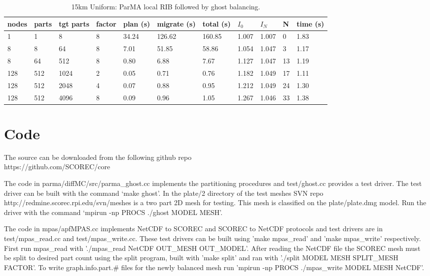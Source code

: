 \documentclass[a4paper]{article}
\begin{document}
\begin{table}
\caption{\label{tab:15kmplrib}15km Uniform: ParMA local RIB followed by ghost balancing.}
\begin{tabular}{  l | l | l | l | l | l | l | l | l | l | l }
    \hline
    nodes & parts & tgt parts & factor & plan (s) & migrate (s) & total (s) & $I_0$ & $I_N$ & N & time (s) \\ \hline
      1 & 1 & 8 & 8 & 34.24 & 126.62 & 160.85 & 1.007 & 1.007 & 0 & 1.83 \\ 
      8 & 8 & 64 & 8 & 7.01 & 51.85 & 58.86 & 1.054 & 1.047 & 3 & 1.17 \\ 
      8 & 64 & 512 & 8 & 0.80 & 6.88 & 7.67 & 1.127 & 1.047 & 13 & 1.19 \\ 
      128 & 512 & 1024 & 2 & 0.05 & 0.71 & 0.76 & 1.182 & 1.049 & 17 & 1.11 \\ 
      128 & 512 & 2048 & 4 & 0.07 & 0.88 & 0.95 & 1.212 & 1.049 & 24 & 1.30 \\ 
      128 & 512 & 4096 & 8 & 0.09 & 0.96 & 1.05 & 1.267 & 1.046 & 33 & 1.38 \\ 
\end{tabular}
\end{table}

\section{Code}

The source can be downloaded from the following github repo \\
https://github.com/SCOREC/core

The code in parma/diffMC/src/parma\_ghost.cc implements the partitioning procedures and test/ghost.cc provides a test driver.  The test driver can be built with the command `make ghost'.  In the plate/2 directory of the test meshes SVN repo http://redmine.scorec.rpi.edu/svn/meshes is a two part 2D mesh for testing.  This mesh is classified on the plate/plate.dmg model.  Run the driver with the command `mpirun -np PROCS ./ghost MODEL MESH'.

The code in mpas/apfMPAS.cc implements NetCDF to SCOREC and SCOREC to NetCDF protocols and test drivers are in test/mpas\_read.cc and test/mpas\_write.cc. These test drivers can be built using 'make mpas\_read' and 'make mpas\_write' respectively. First run mpas\_read with './mpas\_read NetCDF OUT\_MESH OUT\_MODEL'. After reading the NetCDF file the SCOREC mesh must be split to desired part count using the split program, built with 'make split' and ran with './split MODEL MESH SPLIT\_MESH FACTOR'. To write graph.info.part.\# files for the newly balanced mesh run 'mpirun -np PROCS ./mpas\_write MODEL MESH NetCDF'.

\newpage


\end{document}
